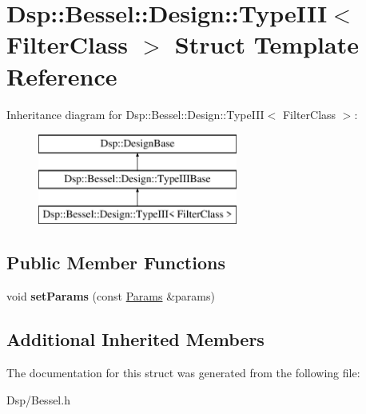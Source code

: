 \hypertarget{structDsp_1_1Bessel_1_1Design_1_1TypeIII}{\section{Dsp\-:\-:Bessel\-:\-:Design\-:\-:Type\-I\-I\-I$<$ Filter\-Class $>$ Struct Template Reference}
\label{structDsp_1_1Bessel_1_1Design_1_1TypeIII}
}
Inheritance diagram for Dsp\-:\-:Bessel\-:\-:Design\-:\-:Type\-I\-I\-I$<$ Filter\-Class $>$\-:\begin{figure}[H]
\begin{center}
\leavevmode
\includegraphics[height=3.000000cm]{structDsp_1_1Bessel_1_1Design_1_1TypeIII}
\end{center}
\end{figure}
\subsection*{Public Member Functions}
\begin{DoxyCompactItemize}
\item 
\hypertarget{structDsp_1_1Bessel_1_1Design_1_1TypeIII_aa7562f4ed29548de979b390176f5b59e}{void {\bfseries set\-Params} (const \hyperlink{structDsp_1_1Params}{Params} \&params)}\label{structDsp_1_1Bessel_1_1Design_1_1TypeIII_aa7562f4ed29548de979b390176f5b59e}

\end{DoxyCompactItemize}
\subsection*{Additional Inherited Members}


The documentation for this struct was generated from the following file\-:\begin{DoxyCompactItemize}
\item 
Dsp/Bessel.\-h\end{DoxyCompactItemize}
